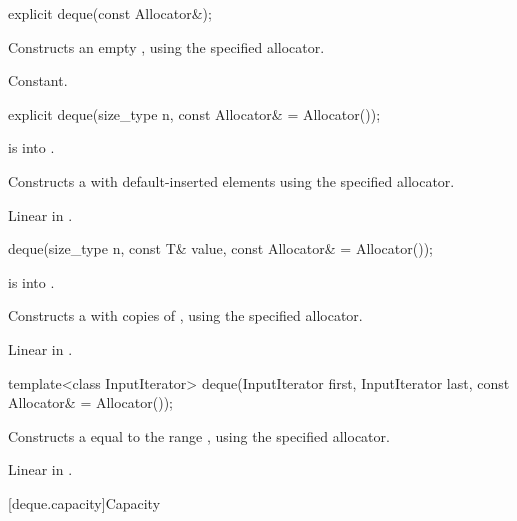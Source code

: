 %
\begin{itemdecl}
explicit deque(const Allocator&);
\end{itemdecl}

\begin{itemdescr}
\pnum
\effects
Constructs an empty
,
using the specified allocator.

\pnum
\complexity
Constant.
\end{itemdescr}

%
\begin{itemdecl}
explicit deque(size_type n, const Allocator& = Allocator());
\end{itemdecl}

\begin{itemdescr}
\pnum
\expects
{} is  into .

\pnum
\effects
Constructs a  with
 default-inserted elements using the specified allocator.

\pnum
\complexity
Linear in .
\end{itemdescr}

%
\begin{itemdecl}
deque(size_type n, const T& value, const Allocator& = Allocator());
\end{itemdecl}

\begin{itemdescr}
\pnum
\expects
{} is  into .

\pnum
\effects
Constructs a
with  copies of ,
using the specified allocator.

\pnum
\complexity
Linear in .
\end{itemdescr}

%
\begin{itemdecl}
template<class InputIterator>
  deque(InputIterator first, InputIterator last, const Allocator& = Allocator());
\end{itemdecl}

\begin{itemdescr}
\pnum
\effects
Constructs a
equal to the range
,
using the specified allocator.

\pnum
\complexity
Linear in .
\end{itemdescr}

[deque.capacity]{Capacity}

